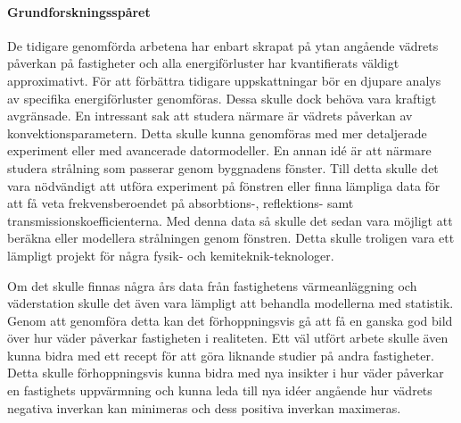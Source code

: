 \paragraph{Grundforskningsspåret}

De tidigare genomförda arbetena har enbart skrapat på ytan angående vädrets påverkan på fastigheter och alla energiförluster
har kvantifierats väldigt approximativt. För att förbättra tidigare uppskattningar bör en djupare analys
av specifika energiförluster genomföras. Dessa skulle dock behöva vara kraftigt avgränsade. En intressant sak att studera
närmare är vädrets påverkan av konvektionsparametern. Detta skulle kunna genomföras med mer detaljerade experiment eller
med avancerade datormodeller. En annan idé är att närmare studera strålning som passerar genom byggnadens fönster. Till detta
skulle det vara nödvändigt att utföra experiment på fönstren eller finna lämpliga data för att få veta frekvensberoendet på absorbtions-, reflektions- samt
transmissionskoefficienterna. Med
denna data så skulle det sedan vara möjligt att beräkna eller modellera strålningen genom fönstren. Detta skulle troligen
vara ett lämpligt projekt för några fysik- och kemiteknik-teknologer.

Om det skulle finnas några års data från fastighetens värmeanläggning och väderstation skulle det även vara lämpligt att behandla modellerna med statistik. Genom att genomföra detta kan det förhoppningsvis
gå att få en ganska god bild över hur väder påverkar fastigheten i realiteten. Ett väl utfört arbete skulle
även kunna bidra med ett recept för att göra liknande studier på andra fastigheter. Detta skulle förhoppningsvis 
kunna bidra med nya insikter i hur väder påverkar en fastighets uppvärmning och kunna leda till nya idéer angående
hur vädrets negativa inverkan kan minimeras och dess positiva inverkan maximeras.

